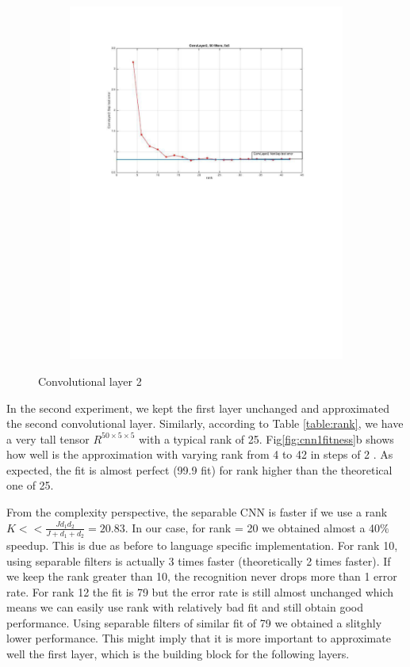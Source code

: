 \begin{figure}[h]
\begin{subfigure}[b]{0.40\textwidth}
    \includegraphics[width=\textwidth]{images/imagesCNN_page1.pdf}
    \caption{}
  \end{subfigure}
  \caption{Convolutional layer 2}
  \label{fig:cnn1error}
\end{figure}

In the second experiment, we kept the first layer unchanged and approximated the second convolutional layer.
Similarly, according to Table \ref{table:rank}, we have a very tall tensor $R^{50\times 5 \times 5}$ with a typical rank of 25.
Fig\ref{fig:cnn1fitness}b shows how well is the approximation with varying rank from 4 to 42 in steps of 2 . As expected, the fit is almost perfect (99.9 fit) for rank higher than the theoretical one of 25.

From the complexity perspective, the separable CNN is faster if we use a rank $K << \frac{Jd_{1}d_{2}}{J +d_{1}+d_{2}} = 20.83$. In our case, for rank = 20 we obtained almost a 40$\%$ speedup. This is due as before to language specific implementation.
For rank 10, using separable filters is actually 3 times faster (theoretically 2 times faster).
If we keep the rank greater than 10, the recognition never drops more than 1 error rate.
For rank 12 the fit is 79 but the error rate is still almost unchanged which means we can easily use rank with relatively bad fit and still obtain good performance. Using separable filters of similar fit of 79  we obtained a slitghly lower performance. This might imply that it is more important to approximate well the first layer, which is the building block for the following layers.
